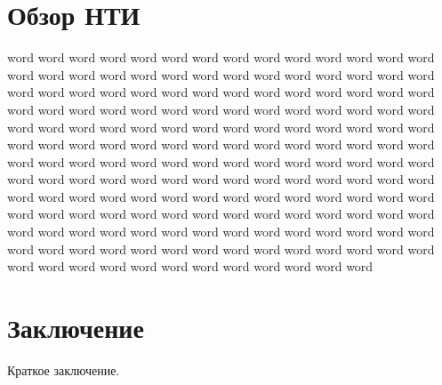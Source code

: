 \documentclass{gostcheck-vkr}
\begin{document}
\section{Обзор НТИ}
word word word word word word word word word word word word word word word word word word word word word word word word word word word word word word word word word word word word word word word word word word word word word word word word word word word word word word word word word word word word word word word word word word word word word word word word word word word word word word word word word word word word word word word word word word word word word word word word word word word word word word word word word word word word word word word word word word word word word word word word word word word word word word word word word word word word word word word word word word word word word word word word word word word word word word word word word word word word word word word word word word word word word word word word word word word word word word word word word word word word 
\section{Заключение}
Краткое заключение.
\end{document}
